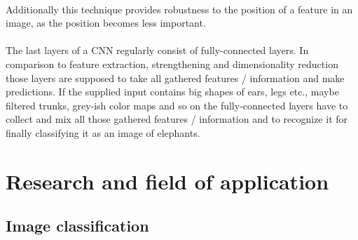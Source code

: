 \documentclass[12pt,twoside]{article}
\theoremstyle{plain}
\theoremstyle{definition}
\theoremstyle{remark}
\begin{document}
\\
Additionally this technique provides robustness to the position of a feature in an image, as the position becomes less important.
\\
\\
The last layers of a CNN regularly consist of fully-connected layers. In comparison to feature extraction, strengthening and dimensionality reduction those layers are supposed to take all gathered features / information and make predictions. If the supplied input contains big shapes of ears, legs etc., maybe filtered trunks, grey-ish color maps and so on the fully-connected layers have to collect and mix all those gathered features / information and to recognize it for finally classifying it as an image of elephants.





\section{Research and field of application}
\label{sec:research_and_application}


\subsection{Image classification}
\end{document}
